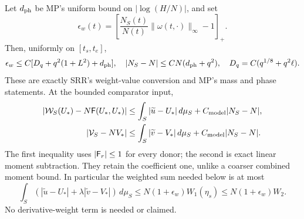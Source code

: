\documentclass[11pt]{article}
\numberwithin{equation}{section}
\theoremstyle{remark}\newtheorem{remark}[theorem]{Remark}
\begin{document}
Let $d_{\rm ph}$ be MP's uniform bound on $|\log(H/N)|$, and set
\begin{equation}
 \epsilon_w(t)=\left[\frac{N_S(t)}{N(t)}
                       \|\omega(t,\cdot)\|_\infty-1\right]_+.
 \label{an03wcsv1:weightcoefficient}
\end{equation}
Then, uniformly on $[t_s,t_e]$,
\begin{equation}
 \epsilon_w\le C[D_q+q^2(1+L^2)+d_{\rm ph}],\quad
 |N_S-N|\le CN(d_{\rm ph}+q^2),\quad
 D_q=C(q^{1/8}+q^2\ell).
 \label{an03wcsv1:weights}
\end{equation}
These are exactly SRR's weight-value conversion and MP's mass
and phase statements. At the bounded comparator input,
\begin{align}
 |\mathcal W_S(U_*)-N\mathsf F(U_*,U_*)|
 &\le\int_S|\widetilde u-U_*|\,d\mu_S
                      +C_{\rm model}|N_S-N|,\notag\\
 |\mathcal V_S-NV_*|
 &\le\int_S|\widetilde v-V_*|\,d\mu_S
                      +C_{\rm model}|N_S-N|.
 \label{an03wcsv1:donorcomparison}
\end{align}
The first inequality uses $|\mathsf F_r|\le1$ for every donor;
the second is exact linear moment subtraction.
They retain the coefficient one, unlike a coarser combined moment
bound. In particular the weighted sum needed below is at most
\begin{equation}
 \int_S(|\widetilde u-U_*|+\lambda|\widetilde v-V_*|)\,d\mu_S
 \le N(1+\epsilon_w)W_1(\eta_s)
 \le N(1+\epsilon_w)W_2.
 \label{an03wcsv1:coefficientone}
\end{equation}
No derivative-weight term is needed or claimed.
\end{document}
